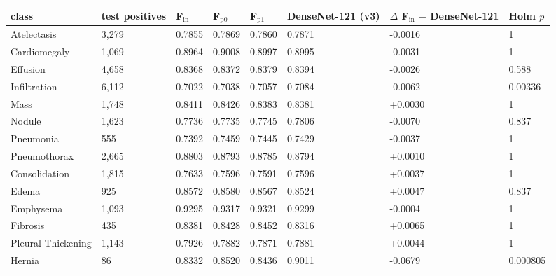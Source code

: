 \begin{tabular}{llllllll}
\toprule
class & test positives & F$_\mathrm{in}$ & F$_\mathrm{p0}$ & F$_\mathrm{p1}$ & DenseNet-121 (v3) & $\Delta$ F$_\mathrm{in}$ $-$ DenseNet-121 & Holm $p$ \\
\midrule
Atelectasis & 3,279 & 0.7855 & 0.7869 & 0.7860 & 0.7871 & -0.0016 & 1 \\
Cardiomegaly & 1,069 & 0.8964 & 0.9008 & 0.8997 & 0.8995 & -0.0031 & 1 \\
Effusion & 4,658 & 0.8368 & 0.8372 & 0.8379 & 0.8394 & -0.0026 & 0.588 \\
Infiltration & 6,112 & 0.7022 & 0.7038 & 0.7057 & 0.7084 & -0.0062 & 0.00336 \\
Mass & 1,748 & 0.8411 & 0.8426 & 0.8383 & 0.8381 & +0.0030 & 1 \\
Nodule & 1,623 & 0.7736 & 0.7735 & 0.7745 & 0.7806 & -0.0070 & 0.837 \\
Pneumonia & 555 & 0.7392 & 0.7459 & 0.7445 & 0.7429 & -0.0037 & 1 \\
Pneumothorax & 2,665 & 0.8803 & 0.8793 & 0.8785 & 0.8794 & +0.0010 & 1 \\
Consolidation & 1,815 & 0.7633 & 0.7596 & 0.7591 & 0.7596 & +0.0037 & 1 \\
Edema & 925 & 0.8572 & 0.8580 & 0.8567 & 0.8524 & +0.0047 & 0.837 \\
Emphysema & 1,093 & 0.9295 & 0.9317 & 0.9321 & 0.9299 & -0.0004 & 1 \\
Fibrosis & 435 & 0.8381 & 0.8428 & 0.8452 & 0.8316 & +0.0065 & 1 \\
Pleural Thickening & 1,143 & 0.7926 & 0.7882 & 0.7871 & 0.7881 & +0.0044 & 1 \\
Hernia & 86 & 0.8332 & 0.8520 & 0.8436 & 0.9011 & -0.0679 & 0.000805 \\
\bottomrule
\end{tabular}
